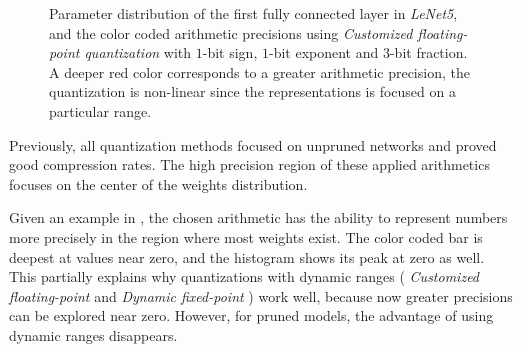 \documentclass[a4paper,12pt]{report}
\begin{document}
\begin{figure}[!h]
\caption{Parameter distribution of the first fully connected layer in \textit{
LeNet5}, and the color coded arithmetic precisions using \textit{Customized floating-point quantization}
with $1$-bit sign, $1$-bit exponent and $3$-bit fraction.
A deeper red color corresponds to a greater arithmetic precision, the quantization is non-linear since
the representations is focused on a particular range.}
\label{fig:weight_dist_cfc}
\end{figure}
Previously, all quantization methods focused on unpruned networks and proved
good compression rates.
The high precision region of these applied arithmetics focuses on the center of
the weights distribution.

Given an example in , the chosen arithmetic has the
ability to represent numbers more precisely in the region where most weights
exist.
The color coded bar is deepest at values near zero, and the histogram
shows its peak at zero as well.
This partially explains why quantizations with dynamic ranges (
\textit{Customized floating-point} and \textit{Dynamic fixed-point}
) work well, because now greater precisions can be explored near zero.
However, for pruned models, the advantage of using dynamic ranges disappears.
\end{document}
